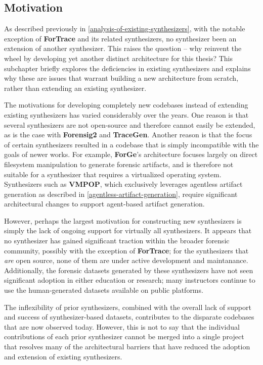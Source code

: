\subsection{Motivation}\label{motivation}

As described previously in \ref{analysis-of-existing-synthesizers}, with the notable exception of
\textbf{ForTrace} and its related synthesizers, no synthesizer been an
extension of another synthesizer. This raises the question -- why
reinvent the wheel by developing yet another distinct architecture for
this thesis? This subchapter briefly explores the deficiencies in
existing synthesizers and explains why these are issues that warrant
building a new architecture from scratch, rather than extending an
existing synthesizer.

The motivations for developing completely new codebases instead of
extending existing synthesizers has varied considerably over the years.
One reason is that several synthesizers are not open-source and
therefore cannot easily be extended, as is the case with
\textbf{Forensig2} and \textbf{TraceGen}. Another reason is that the
focus of certain synthesizers resulted in a codebase that is simply
incompatible with the goals of newer works. For example,
\textbf{ForGe}'s architecture focuses largely on direct filesystem
manipulation to generate forensic artifacts, and is therefore not
suitable for a synthesizer that requires a virtualized operating system.
Synthesizers such as \textbf{VMPOP}, which exclusively leverages
agentless artifact generation as described in \ref{agentless-artifact-generation}, require significant
architectural changes to support agent-based artifact generation.

However, perhaps the largest motivation for constructing new
synthesizers is simply the lack of ongoing support for virtually all
synthesizers. It appears that no synthesizer has gained significant
traction within the broader forensic community, possibly with the
exception of \textbf{ForTrace}; for the synthesizers that \emph{are}
open source, none of them are under active development and maintanance.
Additionally, the forensic datasets generated by these synthesizers have
not seen significant adoption in either education or research; many
instructors continue to use the human-generated datasets available on
public platforms.

The inflexibility of prior synthesizers, combined with the overall lack
of support and success of synthesizer-based datasets, contributes to the
disparate codebases that are now observed today. However, this is not to
say that the individual contributions of each prior synthesizer cannot
be merged into a single project that resolves many of the architectural
barriers that have reduced the adoption and extension of existing
synthesizers.

